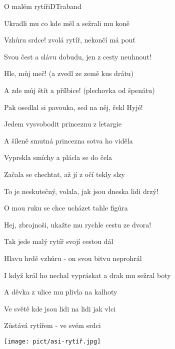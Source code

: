 \begin{song}{O malém rytíři}{D}{Traband}
\begin{SBVerse}
Ukradli mu co kde měl a sežrali mu koně

\end{SBVerse}

\begin{SBVerse}

Vzhůru srdce! zvolá rytíř, nekončí má pouť

Svou čest a slávu dobudu, jen z cesty neuhnout!

Hle, můj meč! (a zvedl ze země kus drátu)

A zde můj štít a přílbice! (plechovka od špenátu)

Pak osedlal si pavouka, sed na něj, řekl Hyjé!

Jedem vysvobodit princeznu z letargie

\end{SBVerse}

\begin{SBVerse}

A šíleně smutná princezna sotva ho viděla

Vyprskla smíchy a plácla se do čela

Začala se chechtat, až jí z očí tekly slzy

To je neskutečný, volala, jak jsou dneska lidi drzý!

O mou ruku se chce ucházet tahle figůra

Hej, zbrojnoši, ukažte mu rychle cestu ze dvora!

\end{SBVerse}

\begin{SBVerse}

Tak jede malý rytíř svojí cestou dál

Hlavu hrdě vzhůru - on svou bitvu neprohrál

I když král ho nechal vypráskat a drak mu sežral boty

A děvka z ulice mu plivla na kalhoty

Ve světě kde jsou lidi na lidi jak vlci

Zůstává rytířem - ve svém srdci

\end{SBVerse}
\begin{center}
\texttt{[image: pict/asi-rytíř.jpg]}
\end{center}
\end{song}

\pagebreak
